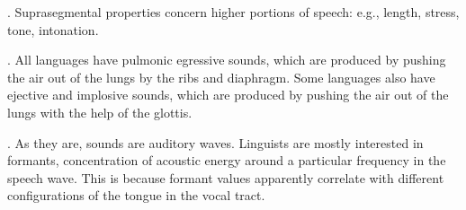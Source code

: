 \documentclass[11pt, oneside]{article}   	%
\begin{document}
\ex. Suprasegmental properties concern higher portions of speech: e.g., length, stress, tone, intonation.

\ex. All languages have pulmonic egressive sounds, which are produced by pushing the air out of the lungs by the ribs and diaphragm. Some languages also have ejective and implosive sounds, which are produced by pushing the air out of the lungs with the help of the glottis.

\ex. As they are, sounds are auditory waves. Linguists are mostly interested in formants, concentration of acoustic energy around a particular frequency in the speech wave. This is because formant values apparently correlate with different configurations of the tongue in the vocal tract.
\end{document}
